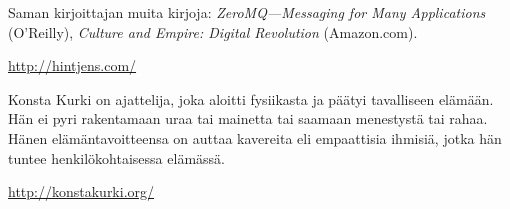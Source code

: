 \documentclass[11pt,oneside]{memoir}
\begin{document}
\vtila

\noindent Saman kirjoittajan muita kirjoja: \emph{ZeroMQ---Messaging for Many Applications} (O'Reilly), \emph{Culture and Empire: Digital Revolution} (Amazon.com).

\vtila

\noindent \url{http://hintjens.com/}

\vspace{1in}

\noindent Konsta Kurki on ajattelija, joka aloitti fysiikasta ja päätyi tavalliseen elämään. Hän ei pyri rakentamaan uraa tai mainetta tai saamaan menestystä tai rahaa. Hänen elämäntavoitteensa on auttaa kavereita eli empaattisia ihmisiä, jotka hän tuntee henkilökohtaisessa elämässä.

\vtila

\noindent \url{http://konstakurki.org/}

\newpage

\tableofcontents

%



\mainmatter




%
%
%
%



\appendix


\end{document}
